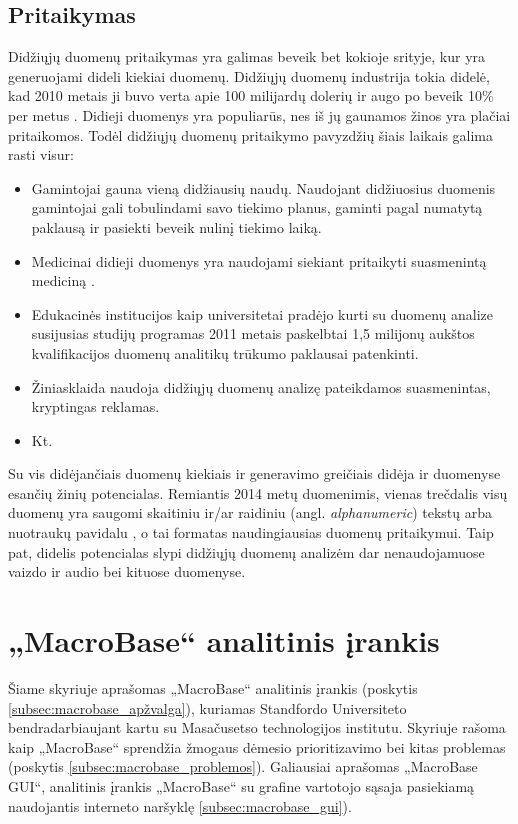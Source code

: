 \documentclass{VUMIFPSkursinis}
\begin{document}
\subsection{Pritaikymas} \label{subsec:pritaikymas}
Didžiųjų duomenų pritaikymas yra galimas beveik bet kokioje srityje, kur yra generuojami dideli kiekiai duomenų. Didžiųjų duomenų industrija tokia didelė, kad 2010 metais ji buvo verta apie 100 milijardų dolerių ir augo po beveik 10\% per metus \cite{bigdata_industry}. Didieji duomenys yra populiarūs, nes iš jų gaunamos žinos yra plačiai pritaikomos. Todėl didžiųjų duomenų pritaikymo pavyzdžių šiais laikais galima rasti visur:
\begin{itemize}
\item Gamintojai gauna vieną didžiausių naudų. Naudojant didžiuosius duomenis gamintojai gali tobulindami savo tiekimo planus, gaminti pagal numatytą paklausą ir pasiekti beveik nulinį tiekimo laiką.

\item Medicinai didieji duomenys yra naudojami siekiant pritaikyti suasmenintą mediciną \cite{in_medicine}.

\item Edukacinės institucijos kaip universitetai pradėjo kurti su duomenų analize susijusias studijų programas 2011 metais paskelbtai 1,5 milijonų aukštos kvalifikacijos duomenų analitikų trūkumo \cite{shortage} paklausai patenkinti.

\item Žiniasklaida naudoja didžiųjų duomenų analizę pateikdamos suasmenintas, kryptingas reklamas.

\item Kt.
\end{itemize}

Su vis didėjančiais duomenų kiekiais ir generavimo greičiais didėja ir duomenyse esančių žinių potencialas. Remiantis 2014 metų duomenimis, vienas trečdalis visų duomenų yra saugomi skaitiniu ir/ar raidiniu (angl. \textit{alphanumeric}) tekstų arba nuotraukų pavidalu \cite{one_third}, o tai formatas naudingiausias duomenų pritaikymui. Taip pat, didelis potencialas slypi didžiųjų duomenų analizėm dar nenaudojamuose vaizdo ir audio bei kituose duomenyse.

\section{„MacroBase“ analitinis įrankis} \label{sec:macro}
Šiame skyriuje aprašomas „MacroBase“ analitinis įrankis (poskytis \ref{subsec:macrobase_apžvalga}), kuriamas Standfordo Universiteto bendradarbiaujant kartu su Masačusetso technologijos institutu. Skyriuje rašoma kaip „MacroBase“ sprendžia žmogaus dėmesio prioritizavimo bei kitas problemas (poskytis \ref{subsec:macrobase_problemos}). Galiausiai aprašomas „MacroBase GUI“, analitinis įrankis „MacroBase“ su grafine vartotojo sąsaja pasiekiamą naudojantis interneto naršyklę \ref{subsec:macrobase_gui}).
\end{document}
